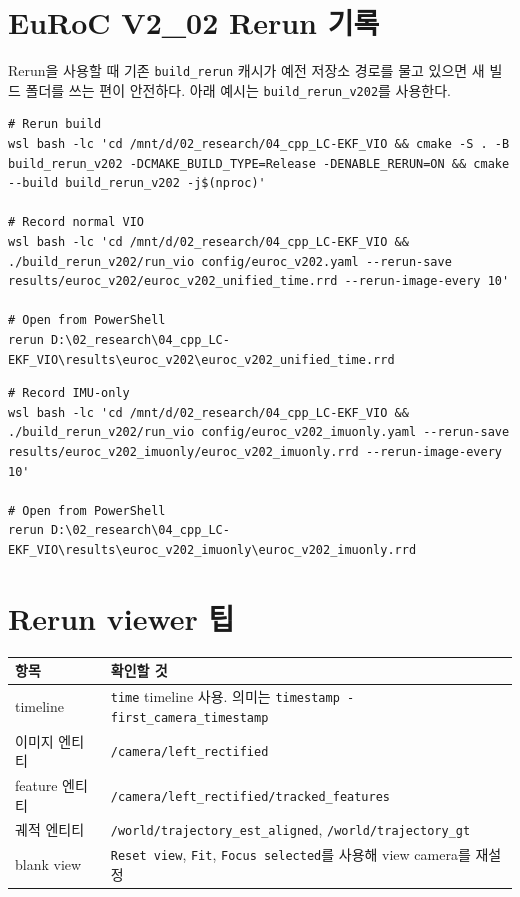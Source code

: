 \documentclass[11pt,a4paper,oneside]{report}
\begin{document}
\section{EuRoC V2\_02 Rerun 기록}

Rerun을 사용할 때 기존 \texttt{build\_rerun} 캐시가 예전 저장소 경로를 물고 있으면
새 빌드 폴더를 쓰는 편이 안전하다. 아래 예시는 \texttt{build\_rerun\_v202}를 사용한다.

\begin{lstlisting}[style=shell,caption={Rerun 빌드와 일반 VIO 기록}]
# Rerun build
wsl bash -lc 'cd /mnt/d/02_research/04_cpp_LC-EKF_VIO && cmake -S . -B build_rerun_v202 -DCMAKE_BUILD_TYPE=Release -DENABLE_RERUN=ON && cmake --build build_rerun_v202 -j$(nproc)'

# Record normal VIO
wsl bash -lc 'cd /mnt/d/02_research/04_cpp_LC-EKF_VIO && ./build_rerun_v202/run_vio config/euroc_v202.yaml --rerun-save results/euroc_v202/euroc_v202_unified_time.rrd --rerun-image-every 10'

# Open from PowerShell
rerun D:\02_research\04_cpp_LC-EKF_VIO\results\euroc_v202\euroc_v202_unified_time.rrd
\end{lstlisting}

\begin{lstlisting}[style=shell,caption={IMU-only Rerun 기록}]
# Record IMU-only
wsl bash -lc 'cd /mnt/d/02_research/04_cpp_LC-EKF_VIO && ./build_rerun_v202/run_vio config/euroc_v202_imuonly.yaml --rerun-save results/euroc_v202_imuonly/euroc_v202_imuonly.rrd --rerun-image-every 10'

# Open from PowerShell
rerun D:\02_research\04_cpp_LC-EKF_VIO\results\euroc_v202_imuonly\euroc_v202_imuonly.rrd
\end{lstlisting}

\section{Rerun viewer 팁}

\begin{longtable}{p{}p{}}
\toprule
항목 & 확인할 것 \\
\midrule
timeline & \texttt{time} timeline 사용. 의미는 \texttt{timestamp - first\_camera\_timestamp} \\
이미지 엔티티 & \texttt{/camera/left\_rectified} \\
feature 엔티티 & \texttt{/camera/left\_rectified/tracked\_features} \\
궤적 엔티티 & \texttt{/world/trajectory\_est\_aligned}, \texttt{/world/trajectory\_gt} \\
blank view & \texttt{Reset view}, \texttt{Fit}, \texttt{Focus selected}를 사용해 view camera를 재설정 \\
\bottomrule
\end{longtable}
\end{document}
